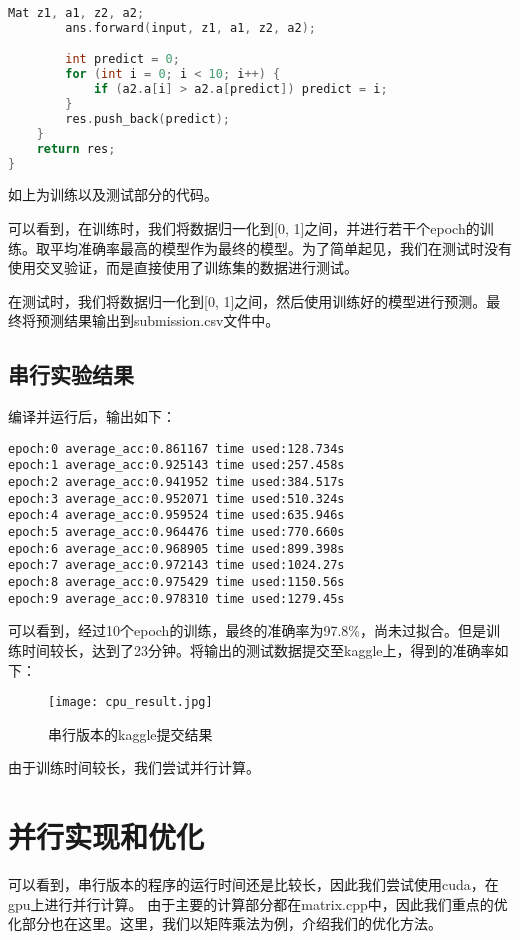\documentclass{ctexart}
\begin{document}
\begin{sloppypar}
\begin{lstlisting}[language=C++]
        Mat z1, a1, z2, a2;
        ans.forward(input, z1, a1, z2, a2);

        int predict = 0;
        for (int i = 0; i < 10; i++) {
            if (a2.a[i] > a2.a[predict]) predict = i;
        }
        res.push_back(predict);
    }
    return res;
}
\end{lstlisting}
如上为训练以及测试部分的代码。

可以看到，在训练时，我们将数据归一化到[0, 1]之间，并进行若干个epoch的训练。取平均准确率最高的模型作为最终的模型。为了简单起见，我们在测试时没有使用交叉验证，而是直接使用了训练集的数据进行测试。

在测试时，我们将数据归一化到[0, 1]之间，然后使用训练好的模型进行预测。最终将预测结果输出到submission.csv文件中。

\subsection{串行实验结果}
编译并运行后，输出如下：
\begin{lstlisting}
epoch:0 average_acc:0.861167 time used:128.734s
epoch:1 average_acc:0.925143 time used:257.458s
epoch:2 average_acc:0.941952 time used:384.517s
epoch:3 average_acc:0.952071 time used:510.324s
epoch:4 average_acc:0.959524 time used:635.946s
epoch:5 average_acc:0.964476 time used:770.660s
epoch:6 average_acc:0.968905 time used:899.398s
epoch:7 average_acc:0.972143 time used:1024.27s
epoch:8 average_acc:0.975429 time used:1150.56s
epoch:9 average_acc:0.978310 time used:1279.45s
\end{lstlisting}
可以看到，经过10个epoch的训练，最终的准确率为97.8\%，尚未过拟合。但是训练时间较长，达到了23分钟。将输出的测试数据提交至kaggle上，得到的准确率如下：
\begin{figure}[H]
    \centering
    \texttt{[image: cpu\_result.jpg]}
    \caption{串行版本的kaggle提交结果}
\end{figure}
由于训练时间较长，我们尝试并行计算。
\section{并行实现和优化}
可以看到，串行版本的程序的运行时间还是比较长，因此我们尝试使用cuda，在gpu上进行并行计算。
由于主要的计算部分都在matrix.cpp中，因此我们重点的优化部分也在这里。这里，我们以矩阵乘法为例，介绍我们的优化方法。

\end{sloppypar}
\end{document}
